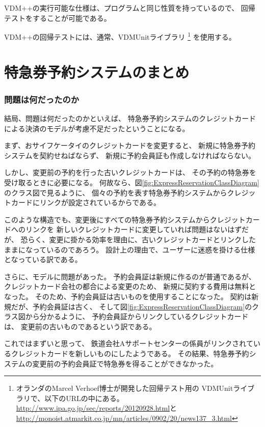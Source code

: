 VDM++の実行可能な仕様は、プログラムと同じ性質を持っているので、
回帰テストをすることが可能である。

VDM++の回帰テストには、通常、VDMUnitライブラリ
\footnote{オランダのMarcel Verhoef博士が開発した回帰テスト用の
VDMUnitライブラリで、以下のURLの中にある。\url{http://www.ipa.go.jp/sec/reports/20120928.html}と\url{http://monoist.atmarkit.co.jp/mn/articles/0902/20/news137_3.html}}
を使用する。


\section {特急券予約システムのまとめ}

	\subsubsection {問題は何だったのか}
結局、問題は何だったのかといえば、
特急券予約システムのクレジットカードによる決済のモデルが考慮不足だったということになる。

まず、おサイフケータイのクレジットカードを変更すると、
新規に特急券予約システムを契約せねばならず、
新規に予約会員証も作成しなければならない。

しかし、変更前の予約を行った古いクレジットカードは、
その予約の特急券を受け取るときに必要になる。
何故なら、図\ref{fig:ExpressReservationClassDiagram}のクラス図で見るように、
個々の予約を表す特急券予約システムからクレジットカードにリンクが設定されているからである。

このような構造でも、変更後にすべての特急券予約システムからクレジットカードへのリンクを
新しいクレジットカードに変更していれば問題はないはずだが、
恐らく、変更に掛かる効率を理由に、古いクレジットカードとリンクしたままになっているのであろう。
設計上の理由で、ユーザーに迷惑を掛ける仕様となっている訳である。

さらに、モデルに問題があった。
予約会員証は新規に作るのが普通であるが、
クレジットカード会社の都合による変更のため、
新規に契約する費用は無料となった。
そのため、予約会員証は古いものを使用することになった。
契約は新規だが、予約会員証は古く、
そして図\ref{fig:ExpressReservationClassDiagram}のクラス図から分かるように、
予約会員証からリンクしているクレジットカードは、
変更前の古いものであるという訳である。

これではまずいと思って、
鉄道会社Aサポートセンターの係員がリンクされているクレジットカードを新しいものにしたようである。
その結果、特急券予約システムの変更前の予約会員証で特急券を得ることができなかった。


